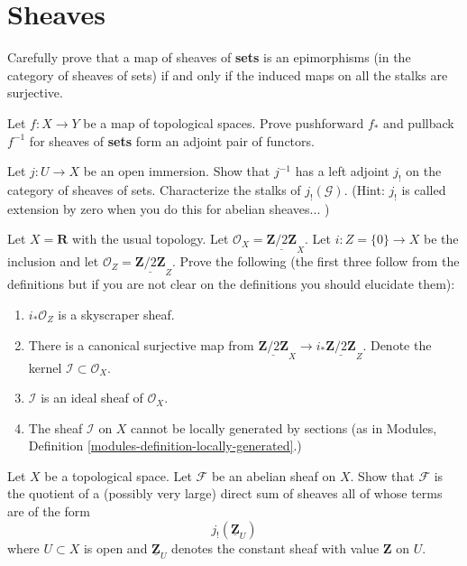 \section{Sheaves}
\label{section-sheaves}

\begin{exercise}
Carefully prove that a map of sheaves of {\bf sets}
is an epimorphisms (in the category of sheaves of sets) if and only if the
induced maps on all the stalks are surjective.
\end{exercise}


\begin{exercise}
Let $f : X \to Y$ be a map of topological spaces.
Prove pushforward $f_\ast$ and pullback $f^{-1}$ for sheaves of {\bf sets}
form an adjoint pair of functors.
\end{exercise}

\begin{exercise}
Let $j : U \to X$ be an open immersion. Show
that $j^{-1}$ has a left adjoint $j_{!}$ on the category of sheaves
of sets. Characterize the stalks of $j_{!}({\mathcal G})$. (Hint: $j_{!}$
is called extension by zero when you do this for abelian sheaves... )
\end{exercise}

\begin{exercise}
\label{exercise-not-locally-generated-by-sections}
Let $X = \mathbf{R}$ with the usual topology.
Let $\mathcal{O}_X = \underline{\mathbf{Z}/2\mathbf{Z}}_X$.
Let $i : Z = \{0\} \to X$ be the inclusion and let
$\mathcal{O}_Z = \underline{\mathbf{Z}/2\mathbf{Z}}_Z$.
Prove the following (the first three follow from the definitions but if you
are not clear on the definitions you should elucidate them):
\begin{enumerate}
\item $i_*\mathcal{O}_Z$ is a skyscraper sheaf.
\item There is a canonical surjective map from
$\underline{\mathbf{Z}/2\mathbf{Z}}_X \to
i_*\underline{\mathbf{Z}/2\mathbf{Z}}_Z$.
Denote the kernel $\mathcal{I} \subset \mathcal{O}_X$.
\item $\mathcal{I}$ is an ideal sheaf of $\mathcal{O}_X$.
\item The sheaf $\mathcal{I}$ on $X$ cannot be locally generated
by sections (as in
Modules, Definition \ref{modules-definition-locally-generated}.)
\end{enumerate}
\end{exercise}

\begin{exercise}
\label{exercise-quotient-j-shriek-Z}
Let $X$ be a topological space.
Let ${\mathcal F}$ be an abelian sheaf on $X$. Show
that ${\mathcal F}$ is the quotient of a (possibly very large) direct sum
of sheaves all of whose terms are of the form
$$
j_{!}(\underline{{\mathbf Z}}_U)
$$
where $U \subset X$ is open and $\underline{{\mathbf Z}}_U$ denotes the
constant sheaf with value ${\mathbf Z}$ on $U$.
\end{exercise}

